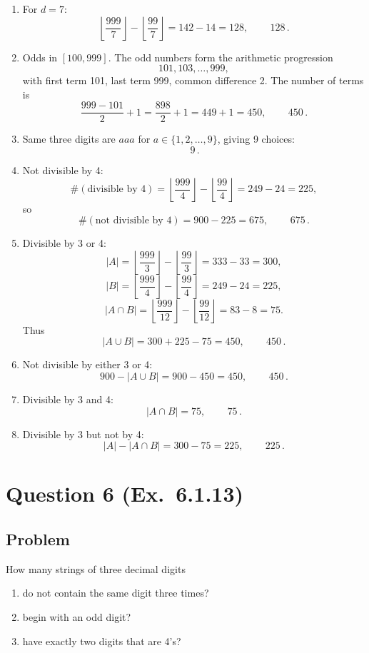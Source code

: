\documentclass[12pt]{article}
\begin{document}
\begin{enumerate}[label=(\alph*)]
\item For $d=7$:
\[
\left\lfloor \frac{999}{7}\right\rfloor - \left\lfloor \frac{99}{7}\right\rfloor
= 142 - 14 = 128,
\qquad
\boxed{\,128\,}.
\]

\item Odds in $[100,999]$.
The odd numbers form the arithmetic progression
\[
101,103,\dots,999,
\]
with first term 101, last term 999, common difference 2. The number of terms is
\[
\frac{999-101}{2}+1 = \frac{898}{2}+1=449+1=450,
\qquad
\boxed{\,450\,}.
\]

\item Same three digits are $aaa$ for $a\in\{1,2,\dots,9\}$, giving 9 choices:
\[
\boxed{\,9\,}.
\]

\item Not divisible by 4:
\[
\#(\text{divisible by 4})=
\left\lfloor \frac{999}{4}\right\rfloor - \left\lfloor \frac{99}{4}\right\rfloor
=249-24=225,
\]
so
\[
\#(\text{not divisible by 4}) = 900-225 = 675,
\qquad
\boxed{\,675\,}.
\]

\item Divisible by 3 or 4:
\[
|A|=\left\lfloor\frac{999}{3}\right\rfloor-\left\lfloor\frac{99}{3}\right\rfloor=333-33=300,
\]
\[
|B|=\left\lfloor\frac{999}{4}\right\rfloor-\left\lfloor\frac{99}{4}\right\rfloor=249-24=225,
\]
\[
|A\cap B|=\left\lfloor\frac{999}{12}\right\rfloor-\left\lfloor\frac{99}{12}\right\rfloor=83-8=75.
\]
Thus
\[
|A\cup B|=300+225-75=450,
\qquad
\boxed{\,450\,}.
\]

\item Not divisible by either 3 or 4:
\[
900-|A\cup B| = 900-450=450,
\qquad
\boxed{\,450\,}.
\]

\item Divisible by 3 and 4:
\[
|A\cap B|=75,
\qquad
\boxed{\,75\,}.
\]

\item Divisible by 3 but not by 4:
\[
|A|-|A\cap B| = 300-75=225,
\qquad
\boxed{\,225\,}.
\]
\end{enumerate}


\newpage
\section{Question 6 (Ex.\ 6.1.13)}
\subsection{Problem}
How many strings of three decimal digits
\begin{enumerate}[label=(\alph*)]
\item do not contain the same digit three times?
\item begin with an odd digit?
\item have exactly two digits that are 4's?
\end{enumerate}
\end{document}
